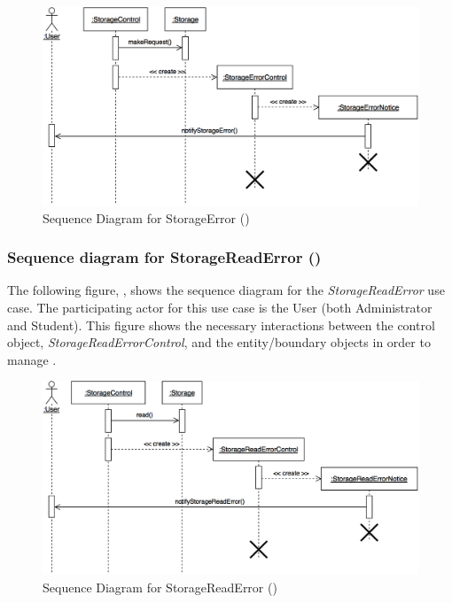 \documentclass[12pt,letterpaper]{article}
\begin{document}
\begin{figure}[H]
	\centering{}
	\includegraphics[scale=0.27]{imgs/seq/storage-error.png}
	\caption[ - Sequence Diagram for StorageError]{Sequence Diagram for StorageError ()}
\end{figure}

\newpage{}

\subsubsection*{Sequence diagram for StorageReadError ()}

The following figure, , shows the sequence diagram for the {\it StorageReadError} use case. The participating actor for this use case is
the User (both Administrator and Student). This figure shows the necessary interactions between the control object, {\it StorageReadErrorControl}, and the
entity/boundary objects in order to manage .

\begin{figure}[H]
	\centering{}
	\includegraphics[scale=0.27]{imgs/seq/storage-read-error.png}
	\caption[ - Sequence Diagram for StorageReadError]{Sequence Diagram for StorageReadError ()}
\end{figure}
\end{document}
